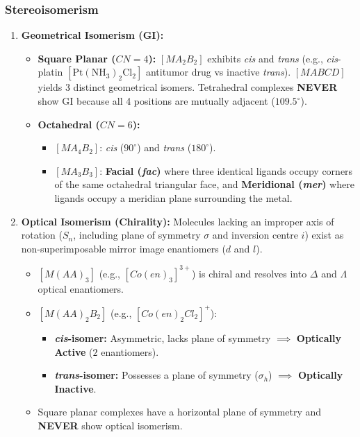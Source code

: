 \documentclass[10pt,twoside,openright]{book}
\begin{document}
\subsubsection{Stereoisomerism}
\begin{enumerate}
  \item \textbf{Geometrical Isomerism (GI):}
  \begin{itemize}
    \item \textbf{Square Planar ($CN=4$):} $[MA_2B_2]$ exhibits \textit{cis} and \textit{trans} (e.g., \textit{cis}-platin $[\mathrm{Pt(NH_3)_2Cl_2}]$ antitumor drug vs inactive \textit{trans}). $[MABCD]$ yields 3 distinct geometrical isomers. Tetrahedral complexes \textbf{NEVER} show GI because all 4 positions are mutually adjacent ($109.5^\circ$).
    \item \textbf{Octahedral ($CN=6$):}
    \begin{itemize}
      \item $[MA_4B_2]$: \textit{cis} ($90^\circ$) and \textit{trans} ($180^\circ$).
      \item $[MA_3B_3]$: \textbf{Facial (\textit{fac})} where three identical ligands occupy corners of the same octahedral triangular face, and \textbf{Meridional (\textit{mer})} where ligands occupy a meridian plane surrounding the metal.
    \end{itemize}
  \end{itemize}
  \item \textbf{Optical Isomerism (Chirality):}
  Molecules lacking an improper axis of rotation ($S_n$, including plane of symmetry $\sigma$ and inversion centre $i$) exist as non-superimposable mirror image enantiomers ($d$ and $l$).
  \begin{itemize}
    \item $[M(AA)_3]$ (e.g., $[Co(en)_3]^{3+}$) is chiral and resolves into $\Delta$ and $\Lambda$ optical enantiomers.
    \item $[M(AA)_2B_2]$ (e.g., $[Co(en)_2Cl_2]^+$):
    \begin{itemize}
      \item \textbf{\textit{cis}-isomer:} Asymmetric, lacks plane of symmetry $\implies$ \textbf{Optically Active} ($2$ enantiomers).
      \item \textbf{\textit{trans}-isomer:} Possesses a plane of symmetry ($\sigma_h$) $\implies$ \textbf{Optically Inactive}.
    \end{itemize}
    \item Square planar complexes have a horizontal plane of symmetry and \textbf{NEVER} show optical isomerism.
  \end{itemize}
\end{enumerate}
\end{document}
